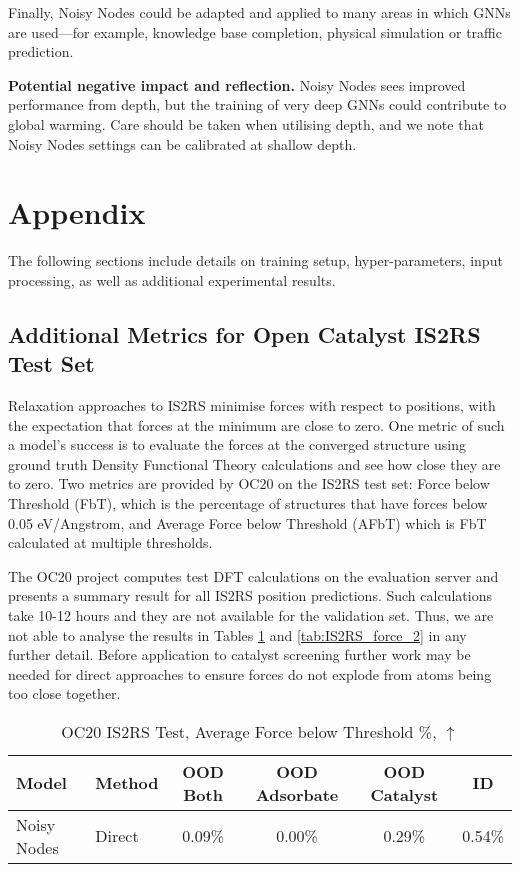 \documentclass{article} \usepackage{iclr2022_conference,times}
\begin{document}
Finally, Noisy Nodes could be adapted and applied to many areas in which GNNs are used---for example, knowledge base completion, physical simulation or traffic prediction.

\textbf{Potential negative impact and reflection.} Noisy Nodes sees improved performance from depth, but the training of very deep GNNs could contribute to global warming. Care should be taken when utilising depth, and we note that Noisy Nodes settings can be calibrated at shallow depth.



\appendix
\section{Appendix}

The following sections include details on training setup, hyper-parameters, input processing, as well as additional experimental results.

\subsection{Additional Metrics for Open Catalyst IS2RS Test Set}

Relaxation approaches to IS2RS minimise forces with respect to positions, with the expectation that forces at the minimum are close to zero. One metric of such a model's success is to evaluate the forces at the converged structure using ground truth Density Functional Theory calculations and see how close they are to zero. Two metrics are provided by OC20 \citep{Chanussot2020TheOC} on the IS2RS test set: Force below Threshold (FbT), which is the percentage of structures that have forces below 0.05 eV/Angstrom, and Average Force below Threshold (AFbT) which is FbT calculated at multiple thresholds.

The OC20 project computes test DFT calculations on the evaluation server and presents a summary result for all IS2RS position predictions. Such calculations take 10-12 hours and they are not available for the validation set. Thus, we are not able to analyse the results in Tables \ref{tab:IS2RS_force_1} and \ref{tab:IS2RS_force_2}  in any further detail. Before application to catalyst screening further work may be needed for direct approaches to ensure forces do not explode from atoms being too close together.

\begin{table}
\caption{OC20 IS2RS Test, Average Force below Threshold \%, $\uparrow$}
\label{tab:IS2RS_force_1}
\centering
\begin{tabular}{llcccc}
  \toprule
  Model & Method & OOD Both & OOD Adsorbate & OOD Catalyst & ID \\
  \midrule
  Noisy Nodes & Direct & 0.09\% & 0.00\% & 0.29\% & 0.54\% \\
  \bottomrule
\end{tabular}
\end{table}
\end{document}
